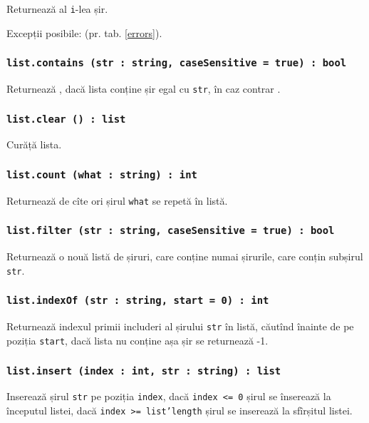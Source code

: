 Returnează al \texttt{i}-lea șir.

Excepții posibile:  (pr. tab. \ref{errors}).

\subsubsection{\texttt{list.contains (str : string, caseSensitive = true) : bool}}

Returnează \true, dacă lista conține șir egal cu \texttt{str}, în caz contrar \false.

\subsubsection{\texttt{list.clear () : list}}

Curăță lista.

\subsubsection{\texttt{list.count (what : string) : int}}

Returnează de cîte ori șirul \texttt{what} se repetă în listă.

\subsubsection{\texttt{list.filter (str : string, caseSensitive = true) : bool}}

Returnează o nouă listă de șiruri, care conține numai șirurile, care conțin subșirul \texttt{str}. 

\subsubsection{\texttt{list.indexOf (str : string, start = 0) : int}}

Returnează indexul primii includeri al șirului \texttt{str} în listă, căutînd înainte de pe poziția \texttt{start}, dacă lista nu conține așa șir se returnează -1.

\subsubsection{\texttt{list.insert (index : int, str : string) : list}}

Inserează șirul \texttt{str} pe poziția \texttt{index}, dacă \texttt{index <= 0} șirul se înserează la începutul listei, dacă \texttt{index >= list'length} șirul se inserează la sfîrșitul listei.

